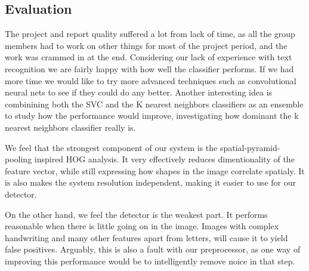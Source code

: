 \documentclass[paper=a4, fontsize=11pt]{scrartcl} %
\numberwithin{equation}{section} %
\numberwithin{figure}{section} %
\numberwithin{table}{section} %
\begin{document}


\subsection{Evaluation}
The project and report quality suffered a lot from lack of time, as all the group members had to work on other things for most of the project period, and the work was crammed in at the end.
Considering our lack of experience with text recognition we are fairly happy with how well the classifier performs.
If we had more time we would like to try more advanced techniques such as convolutional neural nets to see if they could do any better.
Another interesting idea is combinining both the SVC and the K nearest neighbors classifiers as an ensemble to study how the performance would improve, 
investigating how dominant the k nearest neighbors classifier really is.

We feel that the strongest component of our system is the spatial-pyramid-pooling inspired HOG analysis.
It very effectively reduces dimentionality of the feature vector, while still expressing how shapes in the image correlate spatialy.
It is also makes the system resolution independent, making it easier to use for our detector.

On the other hand, we feel the detector is the weakest part.
It performs reasonable when there is little going on in the image.
Images with complex handwriting and many other features apart from letters, will cause it to yield false positives.
Arguably, this is also a fault with our preprocessor, as one way of improving this performance would be to intelligently remove noice in that step.



 
\end{document}
